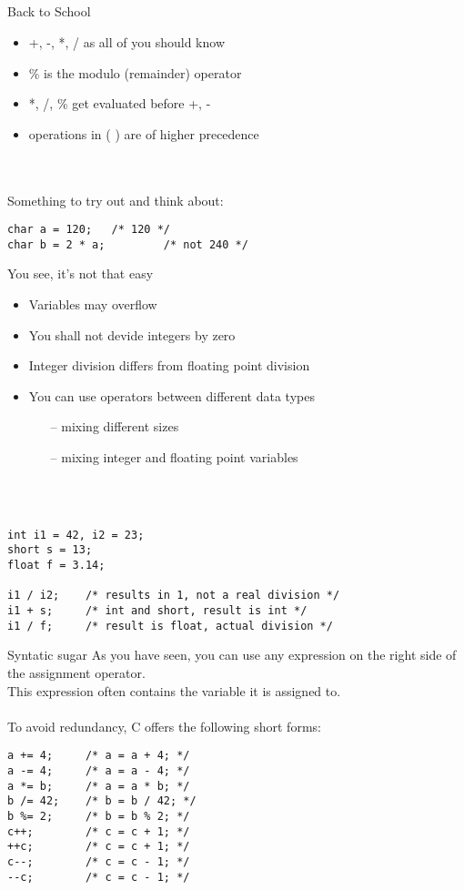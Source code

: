 \subsection{}
\begin{frame}[fragile]{Back to School}
	\begin{itemize}
		\item +, -, *, / as all of you should know
		\item \% is the modulo (remainder) operator
		\item *, /, \% get evaluated before +, -
		\item operations in (  ) are of higher precedence
	\end{itemize}
	\ \\\ \\Something to try out and think about:
	\begin{lstlisting}[numbers=none]
char a = 120;	/* 120 */
char b = 2 * a;			/* not 240 */
\end{lstlisting}
\end{frame}
\begin{frame}[fragile]{You see, it's not that easy}
	\begin{itemize}
		\item Variables may overflow
		\item You shall not devide integers by zero
		\item Integer division differs from floating point division
		\item You can use operators between different data types
		\begin{itemize}
			\item[--] mixing different sizes
			\item[--] mixing integer and floating point variables
		\end{itemize}
	\end{itemize}
	\ \\\ \\
	\begin{lstlisting}[numbers=none]
int i1 = 42, i2 = 23;
short s = 13;
float f = 3.14;

i1 / i2;	/* results in 1, not a real division */
i1 + s;		/* int and short, result is int */
i1 / f;		/* result is float, actual division */
\end{lstlisting}
\end{frame}
\begin{frame}[fragile]{Syntatic sugar}
	As you have seen, you can use any expression on the right side of the assignment operator.\\
	This expression often contains the variable it is assigned to.\\\ \\
	To avoid redundancy, C offers the following short forms:\\
	\begin{lstlisting}[numbers=none]
a += 4;		/* a = a + 4; */
a -= 4;		/* a = a - 4; */
a *= b;		/* a = a * b; */
b /= 42;	/* b = b / 42; */
b %= 2;		/* b = b % 2; */
c++;		/* c = c + 1; */
++c;		/* c = c + 1; */
c--;		/* c = c - 1; */
--c;		/* c = c - 1; */
\end{lstlisting}
\end{frame}
